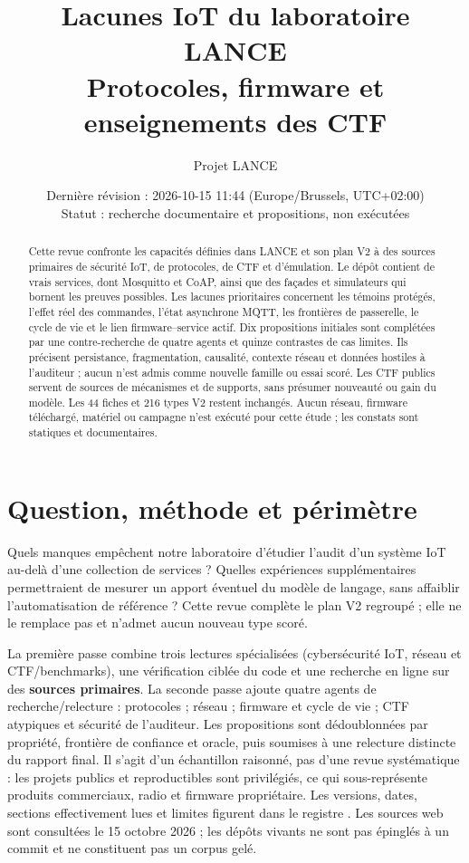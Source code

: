 \documentclass[11pt,a4paper]{article}
\title{Lacunes IoT du laboratoire LANCE\\[4pt]\large Protocoles, firmware et enseignements des CTF}
\author{Projet LANCE}
\date{Dernière révision : 2026-10-15 11:44 (Europe/Brussels, UTC+02:00)\\Statut : recherche documentaire et propositions, non exécutées}
\newcommand{\code}[1]{{\small\ttfamily\path{#1}}}
\begin{document}
\maketitle
\begin{abstract}
Cette revue confronte les capacités définies dans LANCE et son plan V2 à des sources primaires de sécurité IoT, de protocoles, de CTF et d'émulation. Le dépôt contient de vrais services, dont Mosquitto et CoAP, ainsi que des façades et simulateurs qui bornent les preuves possibles. Les lacunes prioritaires concernent les témoins protégés, l'effet réel des commandes, l'état asynchrone MQTT, les frontières de passerelle, le cycle de vie et le lien firmware--service actif. Dix propositions initiales sont complétées par une contre-recherche de quatre agents et quinze contrastes de cas limites. Ils précisent persistance, fragmentation, causalité, contexte réseau et données hostiles à l'auditeur ; aucun n'est admis comme nouvelle famille ou essai scoré. Les CTF publics servent de sources de mécanismes et de supports, sans présumer nouveauté ou gain du modèle. Les 44 fiches et 216 types V2 restent inchangés. Aucun réseau, firmware téléchargé, matériel ou campagne n'est exécuté pour cette étude ; les constats sont statiques et documentaires.
\end{abstract}
{\small\setcounter{tocdepth}{1}\setlength{\parskip}{0pt}\tableofcontents}
\clearpage
\section{Question, méthode et périmètre}
Quels manques empêchent notre laboratoire d'étudier l'audit d'un système IoT au-delà d'une collection de services ? Quelles expériences supplémentaires permettraient de mesurer un apport éventuel du modèle de langage, sans affaiblir l'automatisation de référence ? Cette revue complète le plan V2 regroupé ; elle ne le remplace pas et n'admet aucun nouveau type scoré.

La première passe combine trois lectures spécialisées (cybersécurité IoT, réseau et CTF/benchmarks), une vérification ciblée du code et une recherche en ligne sur des \textbf{sources primaires}. La seconde passe ajoute quatre agents de recherche/relecture : protocoles ; réseau ; firmware et cycle de vie ; CTF atypiques et sécurité de l'auditeur. Les propositions sont dédoublonnées par propriété, frontière de confiance et oracle, puis soumises à une relecture distincte du rapport final. Il s'agit d'un échantillon raisonné, pas d'une revue systématique : les projets publics et reproductibles sont privilégiés, ce qui sous-représente produits commerciaux, radio et firmware propriétaire. Les versions, dates, sections effectivement lues et limites figurent dans le registre \code{revue-iot-ctf.json}. Les sources web sont consultées le 15 octobre 2026 ; les dépôts vivants ne sont pas épinglés à un commit et ne constituent pas un corpus gelé.
\end{document}

